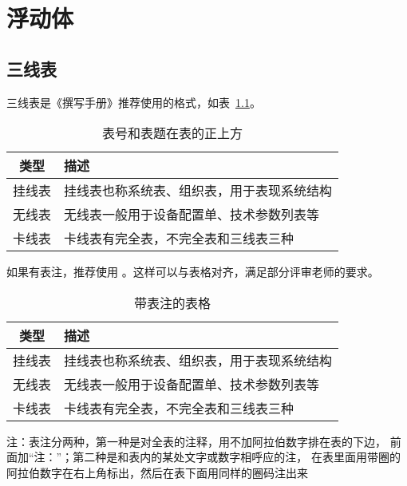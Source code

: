 
\chapter{浮动体}

\section{三线表}

三线表是《撰写手册》推荐使用的格式，如表~\ref{tab:exampletable}。

\begin{table}
  \centering
  \caption{表号和表题在表的正上方}
  \label{tab:exampletable}
  \begin{tabular}{cl}
    \toprule
    类型   & 描述                                       \\
    \midrule
    挂线表 & 挂线表也称系统表、组织表，用于表现系统结构 \\
    无线表 & 无线表一般用于设备配置单、技术参数列表等   \\
    卡线表 & 卡线表有完全表，不完全表和三线表三种       \\
    \bottomrule
  \end{tabular}
\end{table}

如果有表注，推荐使用 。这样可以与表格对齐，满足部分评审老师的要求。

\begin{table}
  \centering
  \begin{threeparttable}
    \caption{带表注的表格}
    \label{tab:tablewithnotes}
    \begin{tabular}{cl}
      \toprule
      类型   & 描述                                       \\
      \midrule
      挂线表 & 挂线表也称系统表、组织表，用于表现系统结构 \\
      无线表 & 无线表一般用于设备配置单、技术参数列表等   \\
      卡线表 & 卡线表有完全表，不完全表和三线表三种       \\
      \bottomrule
    \end{tabular}
    \begin{tablenotes}[flushleft]
      \item 注：表注分两种，第一种是对全表的注释，用不加阿拉伯数字排在表的下边，
      前面加“注：”；第二种是和表内的某处文字或数字相呼应的注，
      在表里面用带圈的阿拉伯数字在右上角标出，然后在表下面用同样的圈码注出来
    \end{tablenotes}
  \end{threeparttable}
\end{table}

